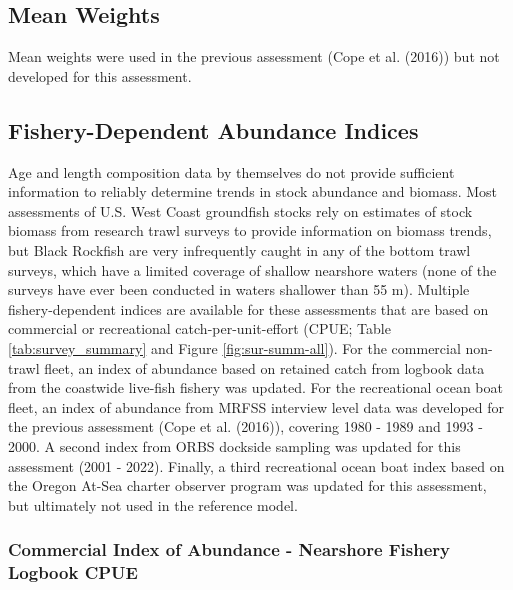 \documentclass[11pt,
  english,
  letterpaper,
]{article}
\begin{document}
\hypertarget{mean-weights}{%
\subsection{Mean Weights}\label{mean-weights}}

Mean weights were used in the previous assessment (Cope et al. (2016)) but not developed for this assessment.

\hypertarget{fishery-dependent-abundance-indices}{%
\subsection{Fishery-Dependent Abundance Indices}\label{fishery-dependent-abundance-indices}}

Age and length composition data by themselves do not provide sufficient information to reliably determine trends in stock abundance and biomass. Most assessments of U.S. West Coast groundfish stocks rely on estimates of stock biomass from research trawl surveys to provide information on biomass trends, but Black Rockfish are very infrequently caught in any of the bottom trawl surveys, which have a limited coverage of shallow nearshore waters (none of the surveys have ever been conducted in waters shallower than 55 m). Multiple fishery-dependent indices are available for these assessments that are based on commercial or recreational catch-per-unit-effort (CPUE; Table \ref{tab:survey_summary} and Figure \ref{fig:sur-summ-all}). For the commercial non-trawl fleet, an index of abundance based on retained catch from logbook data from the coastwide live-fish fishery was updated. For the recreational ocean boat fleet, an index of abundance from MRFSS interview level data was developed for the previous assessment (Cope et al. (2016)), covering 1980 - 1989 and 1993 - 2000. A second index from ORBS dockside sampling was updated for this assessment (2001 - 2022). Finally, a third recreational ocean boat index based on the Oregon At-Sea charter observer program was updated for this assessment, but ultimately not used in the reference model.

\hypertarget{commercial-index-of-abundance---nearshore-fishery-logbook-cpue}{%
\subsubsection{Commercial Index of Abundance - Nearshore Fishery Logbook CPUE}\label{commercial-index-of-abundance---nearshore-fishery-logbook-cpue}}
\end{document}
